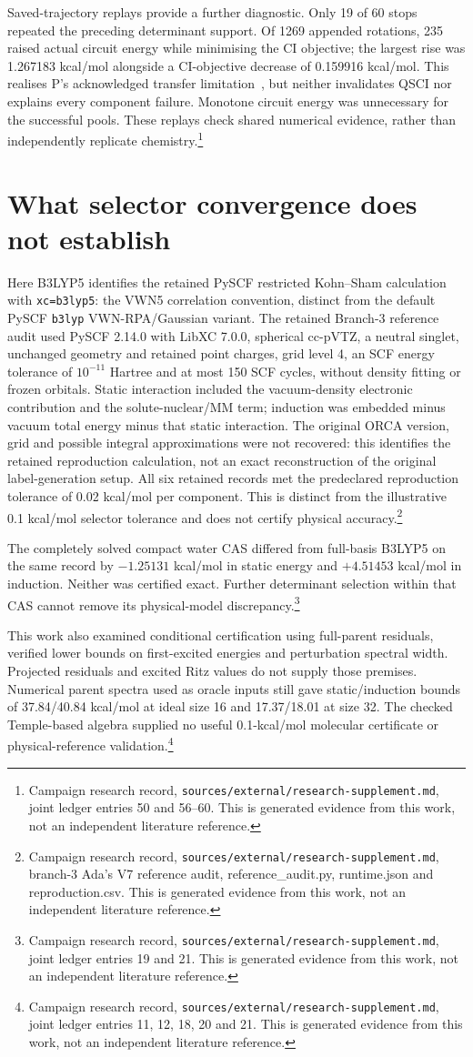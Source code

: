 \documentclass{article}
\newcommand{\record}[1]{\footnote{Campaign research record, \texttt{sources/external/research-supplement.md}, #1. This is generated evidence from this work, not an independent literature reference.}}
\begin{document}
Saved-trajectory replays provide a further diagnostic. Only 19 of 60 stops repeated the preceding determinant support. Of 1269 appended rotations, 235 raised actual circuit energy while minimising the CI objective; the largest rise was 1.267183 kcal/mol alongside a CI-objective decrease of 0.159916 kcal/mol. This realises P's acknowledged transfer limitation~\cite{P}, but neither invalidates QSCI nor explains every component failure. Monotone circuit energy was unnecessary for the successful pools. These replays check shared numerical evidence, rather than independently replicate chemistry.\record{joint ledger entries 50 and 56--60}

\section{What selector convergence does not establish}
Here B3LYP5 identifies the retained PySCF restricted Kohn--Sham calculation with \texttt{xc=b3lyp5}: the VWN5 correlation convention, distinct from the default PySCF \texttt{b3lyp} VWN-RPA/Gaussian variant. The retained Branch-3 reference audit used PySCF 2.14.0 with LibXC 7.0.0, spherical cc-pVTZ, a neutral singlet, unchanged geometry and retained point charges, grid level 4, an SCF energy tolerance of \(10^{-11}\) Hartree and at most 150 SCF cycles, without density fitting or frozen orbitals. Static interaction included the vacuum-density electronic contribution and the solute-nuclear/MM term; induction was embedded minus vacuum total energy minus that static interaction. The original ORCA version, grid and possible integral approximations were not recovered: this identifies the retained reproduction calculation, not an exact reconstruction of the original label-generation setup. All six retained records met the predeclared reproduction tolerance of 0.02 kcal/mol per component. This is distinct from the illustrative 0.1 kcal/mol selector tolerance and does not certify physical accuracy.\record{branch-3 Ada's V7 reference audit, reference\_audit.py, runtime.json and reproduction.csv}

The completely solved compact water CAS differed from full-basis B3LYP5 on the same record by \(-1.25131\) kcal/mol in static energy and \(+4.51453\) kcal/mol in induction. Neither was certified exact. Further determinant selection within that CAS cannot remove its physical-model discrepancy.\record{joint ledger entries 19 and 21}

This work also examined conditional certification using full-parent residuals, verified lower bounds on first-excited energies and perturbation spectral width. Projected residuals and excited Ritz values do not supply those premises. Numerical parent spectra used as oracle inputs still gave static/induction bounds of 37.84/40.84 kcal/mol at ideal size 16 and 17.37/18.01 at size 32. The checked Temple-based algebra supplied no useful 0.1-kcal/mol molecular certificate or physical-reference validation.\record{joint ledger entries 11, 12, 18, 20 and 21}
\end{document}
